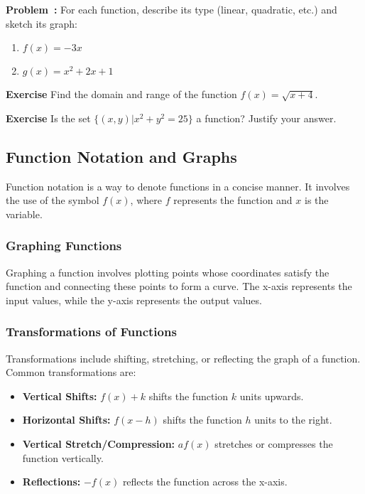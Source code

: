 \documentclass[a4paper,12pt]{book}
\newenvironment{exercise}[1][]
  {\par\medskip\noindent\textbf{Exercise #1} \rmfamily}
  {\medskip}
\newcounter{problem}
\newenvironment{problem}[1][\theproblem]
{\refstepcounter{problem}\par\medskip\noindent\textbf{Problem~#1:} \rmfamily}{\medskip}
\begin{document}
\begin{problem}
For each function, describe its type (linear, quadratic, etc.) and sketch its graph:
\begin{enumerate}[label=(\alph*)]
    \item \( f(x) = -3x \)
    \item \( g(x) = x^2 + 2x + 1 \)
\end{enumerate}
\end{problem}

\begin{exercise}
Find the domain and range of the function \( f(x) = \sqrt{x + 4} \).
\end{exercise}

\begin{exercise}
Is the set \( \{(x, y) | x^2 + y^2 = 25\} \) a function? Justify your answer.
\end{exercise}


\subsection{Function Notation and Graphs}
\label{subsec:function_notation_and_graphs}
Function notation is a way to denote functions in a concise manner. It involves the use of the symbol \( f(x) \), where \( f \) represents the function and \( x \) is the variable.

\subsubsection{Graphing Functions}
Graphing a function involves plotting points whose coordinates satisfy the function and connecting these points to form a curve. The x-axis represents the input values, while the y-axis represents the output values.

\subsubsection{Transformations of Functions}
Transformations include shifting, stretching, or reflecting the graph of a function. Common transformations are:

\begin{itemize}
    \item \textbf{Vertical Shifts:} \( f(x) + k \) shifts the function \( k \) units upwards.
    \item \textbf{Horizontal Shifts:} \( f(x - h) \) shifts the function \( h \) units to the right.
    \item \textbf{Vertical Stretch/Compression:} \( af(x) \) stretches or compresses the function vertically.
    \item \textbf{Reflections:} \( -f(x) \) reflects the function across the x-axis.
\end{itemize}
\end{document}
